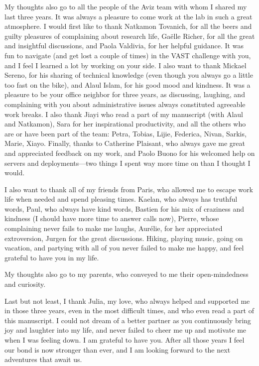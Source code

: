 My thoughts also go to all the people of the Aviz team with whom I shared my last three years. It was always a pleasure to come work at the lab in such a great atmosphere.
I would first like to thank Natkamon Tovanich, for all the beers and guilty pleasures of complaining about research life, Gaëlle Richer, for all the great and insightful discussions, and Paola Valdivia, for her helpful guidance.
It was fun to navigate (and get lost a couple of times) in the VAST challenge with you, and I feel I learned a lot by working on your side.
I also want to thank Mickael Sereno, for his sharing of technical knowledge (even though you always go a little too fast on the bike), and Alaul Islam, for his good mood and kindness. It was a pleasure to be your office neighbor for three years, as discussing, laughing, and complaining with you about administrative issues always constituted agreeable work breaks.
I also thank Jiayi who read a part of my manuscript (with Alaul and Natkamon), Sara for her inspirational productivity, and all the others who are or have been part of the team: Petra, Tobias, Lijie, Federica, Nivan, Sarkis, Marie, Xiayo.
Finally, thanks to Catherine Plaisant, who always gave me great and appreciated feedback on my work, and Paolo Buono for his welcomed help on servers and deployments---two things I spent way more time on than I thought I would.


I also want to thank all of my friends from Paris, who allowed me to escape work life when needed and spend pleasing times.
Kaelan, who always has truthful words, Paul, who always have kind words, Bastien for his mix of craziness and kindness (I should have more time to answer calls now), Pierre, whose complaining never fails to make me laughs, Aurélie, for her appreciated extroversion, Jurgen for the great discussions.
Hiking, playing music, going on vacation, and partying with all of you never failed to make me happy, and feel grateful to have you in my life.



My thoughts also go to my parents, who conveyed to me their open-mindedness and curiosity.



Last but not least, I thank Julia, my love, who always helped and supported me in those three years, even in the most difficult times, and who even read a part of this manuscript.
I could not dream of a better partner as you continuously bring joy and laughter into my life, and never failed to cheer me up and motivate me when I was feeling down. I am grateful to have you.
After all those years I feel our bond is now stronger than ever, and I am looking forward to the next adventures that await us.










